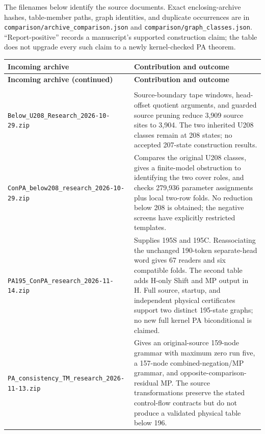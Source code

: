 \label{sec:archive-comparison}


The filenames below identify the source documents. Exact enclosing-archive
hashes, table-member paths, graph identities, and duplicate occurrences are
in \nolinkurl{comparison/archive_comparison.json} and
\nolinkurl{comparison/graph_classes.json}. ``Report-positive'' records a
manuscript's supported construction claim; the table does not upgrade every
such claim to a newly kernel-checked PA theorem.

\begingroup
\small
\setlength{\tabcolsep}{0pt}
\renewcommand{\arraystretch}{1.13}
\begin{longtable}{@{}>{\raggedright\arraybackslash}p{}@{\hspace{.035\textwidth}}>{\raggedright\arraybackslash}p{}@{}}
\toprule
\textbf{Incoming archive} & \textbf{Contribution and outcome}\\
\midrule
\endfirsthead
\toprule
\textbf{Incoming archive (continued)} & \textbf{Contribution and outcome}\\
\midrule
\endhead
\midrule
\multicolumn{2}{r}{\footnotesize Continued on the next page}\\
\endfoot
\bottomrule
\endlastfoot

\nolinkurl{Below_U208_Research_2026-10-29.zip}
& Source-boundary tape windows, head-offset quotient arguments, and guarded
source pruning reduce 3,909 source sites to 3,904. The two inherited U208
classes remain at 208 states; no accepted 207-state construction results.\\[.7ex]

\nolinkurl{ConPA_below208_research_2026-10-29.zip}
& Compares the original U208 classes, gives a finite-model obstruction to
identifying the two cover roles, and checks 279,936 parameter assignments plus
local two-row folds. No reduction below 208 is obtained; the negative screens
have explicitly restricted templates.\\[.7ex]

\nolinkurl{PA195_ConPA_research_2026-11-14.zip}
& Supplies 195S and 195C. Reassociating the unchanged 190-token separate-head
word gives 67 readers and six compatible folds. The second table adds H-only
Shift and MP output in H. Full source, startup, and independent physical
certificates support two distinct 195-state graphs; no new full kernel
PA biconditional is claimed.\\[.7ex]

\nolinkurl{PA_consistency_TM_research_2026-11-13.zip}
& Gives an original-source 159-node grammar with maximum zero run five, a
157-node combined-negation/MP grammar, and opposite-comparison-residual MP.
The source transformations preserve the stated control-flow contracts but do
not produce a validated physical table below 196.\\[.7ex]


\end{longtable}
